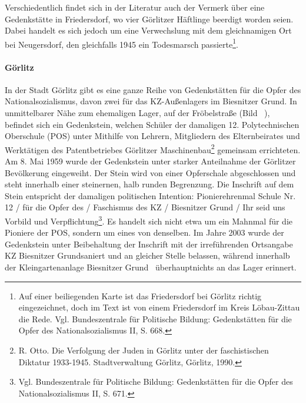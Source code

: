 Verschiedentlich findet sich in der Literatur auch der Vermerk über eine Gedenkstätte in Friedersdorf, wo vier Görlitzer Häftlinge beerdigt worden seien. Dabei handelt es sich jedoch um eine Verwechslung mit dem gleichnamigen Ort bei Neugersdorf, den gleichfalls 1945 ein Todesmarsch passierte\footnote{Auf einer beiliegenden Karte ist das Friedersdorf bei Görlitz richtig eingezeichnet, doch im Text ist von einem Friedersdorf im Kreis Löbau-Zittau die Rede. Vgl. Bundeszentrale für Politische Bildung: Gedenkstätten für die Opfer des Nationalsozialismus II, S. 668.}.


\paragraph{Görlitz}
In der Stadt Görlitz gibt es eine ganze Reihe von Gedenkstätten für die Opfer des Nationalsozialismus, davon zwei für das KZ-Außenlagers im Biesnitzer Grund. 
In unmittelbarer Nähe zum ehemaligen Lager, auf der Fröbelstraße (Bild ~), befindet sich ein Gedenkstein, welchen Schüler der damaligen 12. Polytechnischen Oberschule (POS) unter Mithilfe von \glqq Lehrern, Mitgliedern des Elternbeirates und Werktätigen des Patentbetriebes Görlitzer Maschinenbau\grqq\footnote{R. Otto. Die Verfolgung der Juden in Görlitz unter der faschistischen Diktatur
1933-1945. Stadtverwaltung Görlitz, Görlitz, 1990.}  gemeinsam errichteten. Am 8. Mai 1959 wurde der Gedenkstein unter starker Anteilnahme der Görlitzer Bevölkerung eingeweiht. Der Stein wird von einer Opferschale abgeschlossen und steht innerhalb einer steinernen, halb runden Begrenzung. Die Inschrift auf dem Stein entspricht der damaligen politischen Intention: \glqq Pionierehrenmal Schule Nr. 12 / für die Opfer des / Faschismus des KZ / Biesnitzer Grund / Ihr seid uns Vorbild und Verpflichtung\grqq\footnote{Vgl. Bundeszentrale für Politische Bildung: Gedenkstätten für die Opfer des Nationalsozialismus II, S. 671.}. Es handelt sich nicht etwa um ein Mahnmal für die Pioniere der POS, sondern um eines von denselben. Im Jahre 2003 wurde der Gedenkstein unter Beibehaltung der Inschrift mit der irreführenden Ortsangabe \glqq KZ Biesnitzer Grund\grqq saniert und an gleicher Stelle belassen, während innerhalb der Kleingartenanlage \glqq Biesnitzer Grund\grqq~ überhauptnichts an das Lager erinnert. 


